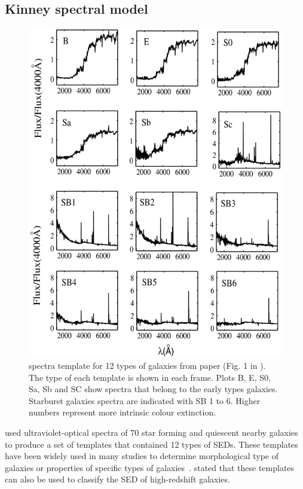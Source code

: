  \subsection{Kinney spectral model}
     \begin{figure}
        \centering
        \includegraphics[width=\textwidth]{../image_paper2/k96.jpg}
        \caption{\citet{Kinney96} spectra template for 12 types of galaxies from \citet{Hossein12} paper (Fig. 1 in \citet{Hossein12}). The type of each template is shown in each frame. Plots B, E, S0, Sa, Sb and SC show spectra that belong to the early types galaxies. Starburst galaxies spectra are indicated with SB 1 to 6. Higher numbers represent more intrinsic colour extinction.}
        \label{fig: k96}
    \end{figure}
      
     used ultraviolet-optical spectra of 70 star forming and quiescent nearby galaxies to produce a set of templates that contained 12 types of SEDs.
    These templates have been widely used in many studies to determine morphological type of galaxies or properties of specific types of galaxies~\citep[e.g.][]{Shakouri16, Paiano16, Laporte16, Holden16}.
     stated that these templates can also be used to classify the SED of high-redshift galaxies. 
    
